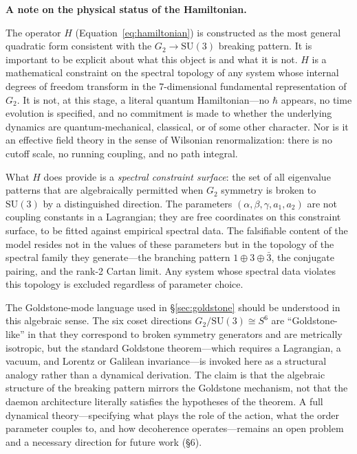 \documentclass[12pt,a4paper]{article}
\begin{document}
\textbf{A note on the physical status of the Hamiltonian.}

The operator $H$ (Equation~\ref{eq:hamiltonian}) is constructed as the most general quadratic form consistent with the $G_2 \to \mathrm{SU}(3)$ breaking pattern. It is important to be explicit about what this object is and what it is not. $H$ is a mathematical constraint on the spectral topology of any system whose internal degrees of freedom transform in the 7-dimensional fundamental representation of $G_2$. It is not, at this stage, a literal quantum Hamiltonian---no $\hbar$ appears, no time evolution is specified, and no commitment is made to whether the underlying dynamics are quantum-mechanical, classical, or of some other character. Nor is it an effective field theory in the sense of Wilsonian renormalization: there is no cutoff scale, no running coupling, and no path integral.

What $H$ does provide is a \emph{spectral constraint surface}: the set of all eigenvalue patterns that are algebraically permitted when $G_2$ symmetry is broken to $\mathrm{SU}(3)$ by a distinguished direction. The parameters $(\alpha, \beta, \gamma, a_1, a_2)$ are not coupling constants in a Lagrangian; they are free coordinates on this constraint surface, to be fitted against empirical spectral data. The falsifiable content of the model resides not in the values of these parameters but in the topology of the spectral family they generate---the branching pattern $1 \oplus 3 \oplus \bar{3}$, the conjugate pairing, and the rank-2 Cartan limit. Any system whose spectral data violates this topology is excluded regardless of parameter choice.

The Goldstone-mode language used in \S\ref{sec:goldstone} should be understood in this algebraic sense. The six coset directions $G_2/\mathrm{SU}(3) \cong S^6$ are ``Goldstone-like'' in that they correspond to broken symmetry generators and are metrically isotropic, but the standard Goldstone theorem---which requires a Lagrangian, a vacuum, and Lorentz or Galilean invariance---is invoked here as a structural analogy rather than a dynamical derivation. The claim is that the algebraic structure of the breaking pattern mirrors the Goldstone mechanism, not that the daemon architecture literally satisfies the hypotheses of the theorem. A full dynamical theory---specifying what plays the role of the action, what the order parameter couples to, and how decoherence operates---remains an open problem and a necessary direction for future work (\S6).
\end{document}
